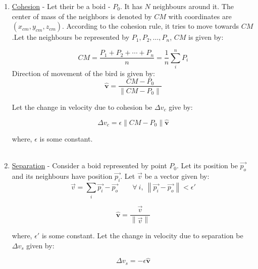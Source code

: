 \documentclass[a4paper]{article}
\newcommand\norm[1]{\left\lVert#1\right\rVert}
\newcommand{\uvec}[1]{\boldsymbol{\hat{{#1}}}}
\begin{document}
\begin{enumerate}
\item\underline{Cohesion} - Let their be a boid - $P_{0}$. It has $N$ neighbours around it. The center of mass of the neighbors is denoted by $CM$ with coordinates are $(x_{cm}, y_{cm}, z_{cm})$. According to the cohesion rule, it tries to move towards $CM$.Let the neighbours be represented by $P_{1}, P_{2}, \ldots, P_{n}$, $CM$ is given by:
	
 
\[CM = \frac{P_1 + P_2 + \cdots + P_n}{n}
      = \frac{1}{n}\sum_{i}^{n} P_i\]
Direction of movement of the bird is given by:
 \[ \uvec{v} = \frac{CM - P_{0}}{\norm {CM - P_{0}}}\]

Let the change in velocity due to cohesion be $\Delta v_{c}$ give by:

\[ \Delta v_{c} = \epsilon \norm{CM - P_{0}} \uvec{v} \]

where, $\epsilon$ is some constant.\\\\

\item\underline{Separation} - Consider a boid represented by point $P_0$. Let its position be $\vec{p_{o}}$ and its neighbours have position $\vec{p_{i}}$. Let $\vec{v}$ be a vector given by:
\[ \vec{v} = \sum_{i}^{} \vec{p_{i}} - \vec{p_{o}}  \qquad \forall\: i, \:\norm{ \vec{p_{i}} - \vec{p_{o}}} < \epsilon' \]

\[ \uvec{v} = \frac{\vec{v}}{\norm{\vec{v}}} \]

where, $\epsilon'$ is some constant. Let the change in velocity due to separation be $\Delta v_{s}$ given by:

\[ \Delta v_{s} = -\epsilon \uvec{v} \]




\end{enumerate}
\end{document}

